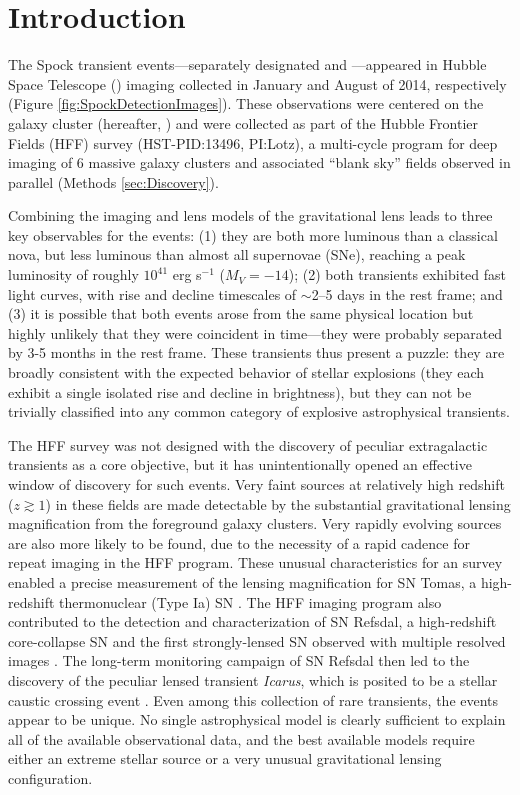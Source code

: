 \section{Introduction}\label{sec:Introduction}

The Spock transient events---separately designated \spockone and
\spocktwo---appeared in Hubble Space Telescope (\HST) imaging
collected in January and August of 2014, respectively (Figure
\ref{fig:SpockDetectionImages}).  These observations were centered on
the galaxy cluster  (hereafter, ) and were collected
as part of the Hubble Frontier Fields (HFF) survey (HST-PID:13496,
PI:Lotz), a multi-cycle program for deep imaging of 6 massive galaxy
clusters and associated ``blank sky'' fields observed in parallel
(Methods \ref{sec:Discovery}).

Combining the \HST imaging and lens models of the 
gravitational lens leads to three key observables for the \spock
events: (1) they are both more luminous than a classical nova, but
less luminous than almost all supernovae (SNe), reaching a peak
luminosity of roughly $10^{41}$ erg s$^{-1}$ ($M_V=−14$); (2) both
transients exhibited fast light curves, with rise and decline
timescales of $\sim$2--5 days in the rest frame; and (3) it is
possible that both events arose from the same physical location but
highly unlikely that they were coincident in time---they were probably
separated by 3-5 months in the rest frame. These transients thus
present a puzzle: they are broadly consistent with the expected
behavior of stellar explosions (they each exhibit a single isolated
rise and decline in brightness), but they can not be trivially
classified into any common category of explosive astrophysical
transients.

The HFF survey was not designed with the discovery of peculiar
extragalactic transients as a core objective, but it has
unintentionally opened an effective window of discovery for such
events.  Very faint sources at relatively high redshift ($z\gtrsim1$)
in these fields are made detectable by the substantial gravitational
lensing magnification from the foreground galaxy clusters.  Very
rapidly evolving sources are also more likely to be found, due to the
necessity of a rapid cadence for repeat imaging in the HFF program.
These unusual characteristics for an \HST survey enabled a precise
measurement of the lensing magnification for SN Tomas, a high-redshift
thermonuclear (Type Ia) SN \citep{Rodney:2015a}.  The HFF imaging
program also contributed to the detection and characterization of SN
Refsdal, a high-redshift core-collapse SN and the first
strongly-lensed SN observed with multiple resolved images
\citep{Kelly:2015a}.  The long-term monitoring campaign of SN Refsdal
then led to the discovery of the peculiar lensed transient {\it
  Icarus}, which is posited to be a stellar caustic crossing event
\citep{Kelly:2017}.  Even among this collection of rare transients,
the \spock events appear to be unique.  No single
astrophysical model is clearly sufficient to explain all of the
available observational data, and the best available models require
either an extreme stellar source or a very unusual gravitational
lensing configuration.

